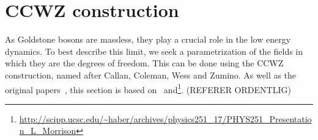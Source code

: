 \section{CCWZ construction}

As Goldstone bosons are massless, they play a crucial role in the low energy dynamics.
To best describe this limit, we seek a parametrization of the fields in which they are the degrees of freedom.
This can be done using the CCWZ construction, named after Callan, Coleman, Wess and Zumino.
As well as the original papers~\cite{Structure_of_phen_1,Structure_of_phen_2}, this section is based on~\cite{weinberg_1996_vol2,The_composite_NG_Higgs,effective_FT_with_NG_modes} and\footnote{\url{http://scipp.ucsc.edu/~haber/archives/physics251_17/PHYS251_Presentation_L_Morrison}}. (REFERER ORDENTLIG)


